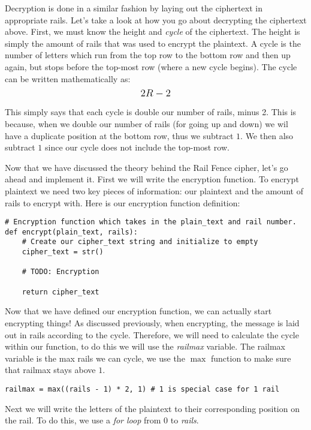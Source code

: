 Decryption is done in a similar fashion by laying out the ciphertext in appropriate rails. Let's take a look at how
you go about decrypting the ciphertext above. First, we must know the height and \textit{cycle} of the ciphertext. The height
is simply the amount of rails that was used to encrypt the plaintext. A cycle is the number of letters which run from the top 
row to the bottom row and then up again, but stops before the top-most row (where a new cycle begins). The cycle can be 
written mathematically as: $$\mathlarger{2R - 2}$$ 

This simply says that each cycle is double our number of rails, minus 2. This is because, when we double our number of rails
(for going up and down) we wil have a duplicate position at the bottom row, thus we subtract $1$. We then also 
subtract $1$ since our cycle does not include the top-most row.

Now that we have discussed the theory behind the Rail Fence cipher, let's go ahead and implement it.
First we will write the encryption function. To encrypt plaintext we need two key pieces of information:
our plaintext and the amount of rails to encrypt with. Here is our encryption function definition:

\begin{verbatim}
# Encryption function which takes in the plain_text and rail number.
def encrypt(plain_text, rails):
    # Create our cipher_text string and initialize to empty
    cipher_text = str()

    # TODO: Encryption

    return cipher_text
\end{verbatim}

Now that we have defined our encryption function, we can actually start encrypting things! As discussed previously,
when encrypting, the message is laid out in rails according to the cycle. Therefore, we will need to calculate the cycle
within our function, to do this we will use the \textit{railmax} variable. The railmax variable is the max rails we can cycle,
we use the $\max$ function to make sure that railmax stays above $1$. 

\begin{verbatim}
railmax = max((rails - 1) * 2, 1) # 1 is special case for 1 rail    
\end{verbatim}

Next we will write the letters of the plaintext to
their corresponding position on the rail. To do this, we use a \textit{for loop} from 0 to \textit{rails}. 

